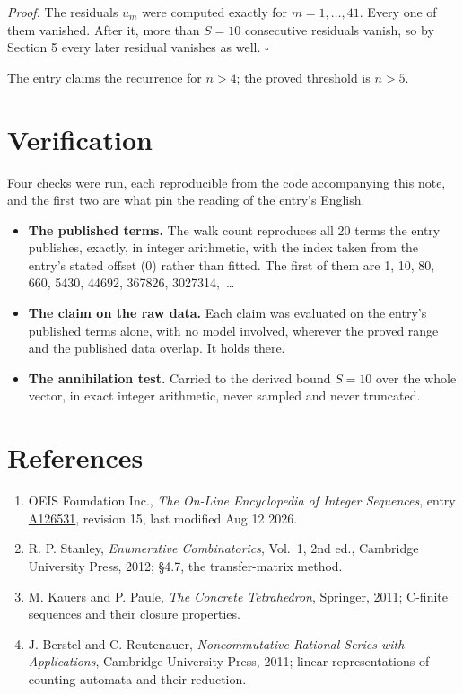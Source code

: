 \documentclass[11pt]{article}
\theoremstyle{definition}
\begin{document}
{\itshape Proof.} The residuals $u_m$ were computed exactly for $m = 1,\dots,41$. Every one of them vanished. After it, more than $S = 10$ consecutive residuals vanish, so by Section 5 every later residual vanishes as well. $\square$

The entry claims the recurrence for $n > 4$; the proved threshold is $n > 5$.

\section{Verification}

Four checks were run, each reproducible from the code accompanying this note, and the first two are what pin the reading of the entry's English.

\begin{itemize}

\item {\bfseries The published terms.} The walk count reproduces all 20 terms the entry publishes, exactly, in integer arithmetic, with the index taken from the entry's stated offset (0) rather than fitted. The first of them are 1, 10, 80, 660, 5430, 44692, 367826, 3027314,~\dots

\item {\bfseries The claim on the raw data.} Each claim was evaluated on the entry's published terms alone, with no model involved, wherever the proved range and the published data overlap. It holds there.

\item {\bfseries The annihilation test.} Carried to the derived bound $S = 10$ over the whole vector, in exact integer arithmetic, never sampled and never truncated.

\end{itemize}

\section{References}

\begin{enumerate}

\item OEIS Foundation Inc., \emph{The On-Line Encyclopedia of Integer Sequences}, entry \href{https://oeis.org/A126531}{A126531}, revision 15, last modified Aug 12 2026.

\item R. P. Stanley, \emph{Enumerative Combinatorics}, Vol.~1, 2nd ed., Cambridge University Press, 2012; \S4.7, the transfer-matrix method.

\item M. Kauers and P. Paule, \emph{The Concrete Tetrahedron}, Springer, 2011; C-finite sequences and their closure properties.

\item J. Berstel and C. Reutenauer, \emph{Noncommutative Rational Series with Applications}, Cambridge University Press, 2011; linear representations of counting automata and their reduction.

\end{enumerate}
\end{document}

